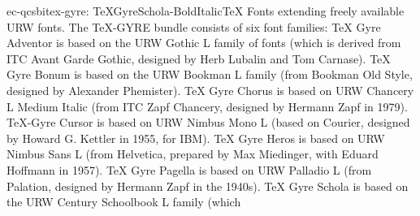 \documentclass{ddltxtyp}
\begin{document}
\begin{package}{ec-qcsbi}{tex-gyre: TeXGyreSchola-BoldItalic}{{\TeX} Fonts extending freely available URW fonts.}
The {\TeX}-GYRE bundle consists of six font families: {\TeX} Gyre
Adventor is based on the URW Gothic L family of fonts (which is
derived from ITC Avant Garde Gothic, designed by Herb Lubalin
and Tom Carnase). {\TeX} Gyre Bonum is based on the URW Bookman L
family (from Bookman Old Style, designed by Alexander
Phemister). {\TeX} Gyre Chorus is based on URW Chancery L Medium
Italic (from ITC Zapf Chancery, designed by Hermann Zapf in
1979). {\TeX}-Gyre Cursor is based on URW Nimbus Mono L (based on
Courier, designed by Howard G. Kettler in 1955, for IBM). {\TeX}
Gyre Heros is based on URW Nimbus Sans L (from Helvetica,
prepared by Max Miedinger, with Eduard Hoffmann in 1957). {\TeX}
Gyre Pagella is based on URW Palladio L (from Palation,
designed by Hermann Zapf in the 1940s). {\TeX} Gyre Schola is
based on the URW Century Schoolbook L family (which %
\end{package}
\end{document}
